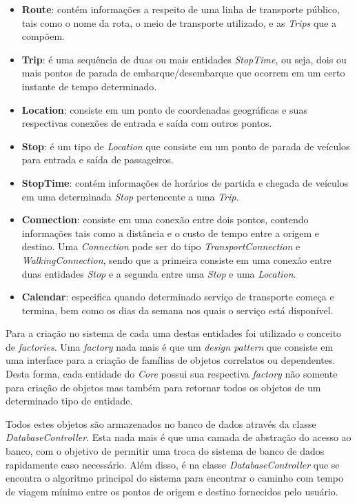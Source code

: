 \begin{itemize}
	\item \textbf{Route}: contém informações a respeito de uma linha de transporte público, tais como o nome da rota, o meio de transporte utilizado, e as \emph{Trips} que a compõem.
	\item \textbf{Trip}: é uma sequência de duas ou mais entidades \emph{StopTime}, ou seja, dois ou mais pontos de parada de embarque/desembarque que ocorrem em um certo instante de tempo determinado.
	\item \textbf{Location}: consiste em um ponto de coordenadas geográficas e suas respectivas conexões de entrada e saída com outros pontos.
	\item \textbf{Stop}: é um tipo de \emph{Location} que consiste em um ponto de parada  de veículos para entrada e saída de passageiros.
	\item \textbf{StopTime}: contém informações de horários de partida e chegada de veículos em uma determinada \emph{Stop} pertencente a uma \emph{Trip}.
	\item \textbf{Connection}: consiste em uma conexão entre dois pontos, contendo informações tais como a distância e o custo de tempo entre a origem e destino. 
					Uma \emph{Connection} pode ser do tipo \emph{TransportConnection} e \emph{WalkingConnection}, sendo que a primeira consiste em uma conexão entre duas entidades \emph{Stop} e a segunda entre uma \emph{Stop} e uma 								\emph{Location}.
	\item \textbf{Calendar}: especifica quando determinado serviço de transporte começa e termina, bem como os dias da semana nos quais o serviço está disponível.
\end{itemize}

Para a criação no sistema de cada uma destas entidades foi utilizado o conceito de \emph{factories}. 
Uma \emph{factory} nada mais é que um \emph{design pattern} que consiste em uma interface para a criação de famílias de objetos correlatos ou dependentes.
Desta forma, cada entidade do \emph{Core} possui sua respectiva \emph{factory} não somente para criação de objetos mas também para retornar todos os objetos de um determinado tipo de entidade.

Todos estes objetos são armazenados no banco de dados através da classe \emph{DatabaseController}.
Esta nada mais é que uma camada de abstração do acesso ao banco, com o objetivo de permitir uma troca do sistema de banco de dados rapidamente caso necessário.
Além disso, é na classe \emph{DatabaseController} que se encontra o algoritmo principal do sistema para encontrar o caminho com tempo de viagem mínimo entre os pontos de origem e destino fornecidos pelo usuário.


